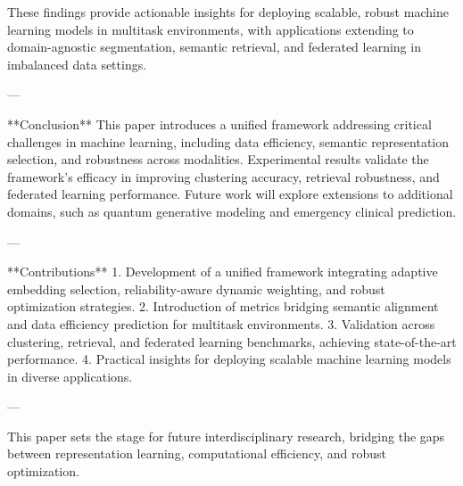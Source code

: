 These findings provide actionable insights for deploying scalable, robust machine learning models in multitask environments, with applications extending to domain-agnostic segmentation, semantic retrieval, and federated learning in imbalanced data settings.

---

**Conclusion**  
This paper introduces a unified framework addressing critical challenges in machine learning, including data efficiency, semantic representation selection, and robustness across modalities. Experimental results validate the framework's efficacy in improving clustering accuracy, retrieval robustness, and federated learning performance. Future work will explore extensions to additional domains, such as quantum generative modeling and emergency clinical prediction.

---

**Contributions**  
1. Development of a unified framework integrating adaptive embedding selection, reliability-aware dynamic weighting, and robust optimization strategies.  
2. Introduction of metrics bridging semantic alignment and data efficiency prediction for multitask environments.  
3. Validation across clustering, retrieval, and federated learning benchmarks, achieving state-of-the-art performance.  
4. Practical insights for deploying scalable machine learning models in diverse applications.  

--- 

This paper sets the stage for future interdisciplinary research, bridging the gaps between representation learning, computational efficiency, and robust optimization.